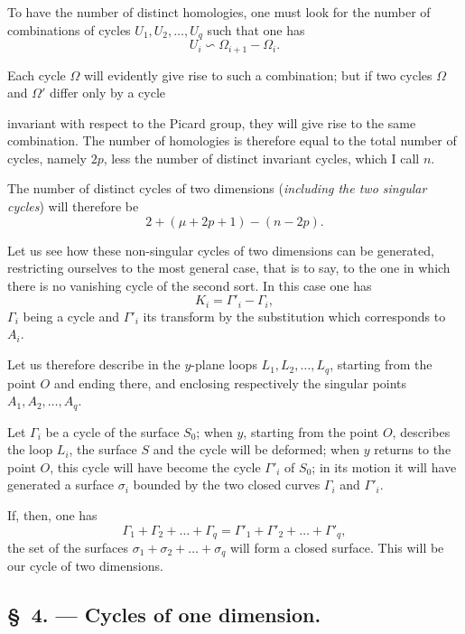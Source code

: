 \documentclass{article}
\begin{document}
To have the number of distinct homologies, one must look for the number of combinations of cycles $U_{1}, U_{2}, \ldots, U_{q}$ such that one has
\[ U_{i} \backsim \Omega_{i+1} - \Omega_{i}. \]

Each cycle $\Omega$ will evidently give rise to such a combination; but if two cycles $\Omega$ and $\Omega'$ differ only by a cycle

invariant with respect to the Picard group, they will give rise to the same combination. The number of homologies is therefore equal to the total number of cycles, namely $2p$, less the number of distinct invariant cycles, which I call $n$.

The number of distinct cycles of two dimensions (\emph{including the two singular cycles}) will therefore be
\[ 2 + (\mu + 2p + 1) - (n - 2p). \]

Let us see how these non-singular cycles of two dimensions can be generated, restricting ourselves to the most general case, that is to say, to the one in which there is no vanishing cycle of the second sort. In this case one has
\[ K_{i} = \Gamma'_{i} - \Gamma_{i}, \]
$\Gamma_{i}$ being a cycle and $\Gamma'_{i}$ its transform by the substitution which corresponds to $A_{i}$.

Let us therefore describe in the $y$-plane loops $L_{1}, L_{2}, \ldots, L_{q}$, starting from the point $O$ and ending there, and enclosing respectively the singular points $A_{1}, A_{2}, \ldots, A_{q}$.

Let $\Gamma_{i}$ be a cycle of the surface $S_{0}$; when $y$, starting from the point $O$, describes the loop $L_{i}$, the surface $S$ and the cycle will be deformed; when $y$ returns to the point $O$, this cycle will have become the cycle $\Gamma'_{i}$ of $S_{0}$; in its motion it will have generated a surface $\sigma_{i}$ bounded by the two closed curves $\Gamma_{i}$ and $\Gamma'_{i}$.

If, then, one has
\[ \Gamma_{1} + \Gamma_{2} + \ldots + \Gamma_{q} = \Gamma'_{1} + \Gamma'_{2} + \ldots + \Gamma'_{q}, \]
the set of the surfaces $\sigma_{1} + \sigma_{2} + \ldots + \sigma_{q}$ will form a closed surface. This will be our cycle of two dimensions.

\subsection*{\S~4. --- Cycles of one dimension.}
\end{document}
